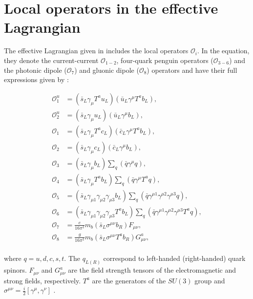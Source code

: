 \chapter{Local operators in the effective Lagrangian}\label{sec:appendix_local_opperators}

The effective Lagrangian given in  includes the local operators $\mathcal{O}_i$.
In the equation, they denote the current-current $\mathcal{O}_{1-2}$, four-quark penguin operators ($\mathcal{O}_{3-6}$) and the photonic dipole ($\mathcal{O}_{7}$) and gluonic dipole ($\mathcal{O}_{8}$) operators \cite{Misiak:2015xwa} and have their full expressions given by \cite{Kaminski:2012eb,Chetyrkin:1996vx}:

\begin{align*}
    \mathcal{O}_1^u & = (\bar{s}_L\gamma_\mu T^a u_L)(\bar{u}_L\gamma^\mu T^a b_L), \\
    \mathcal{O}_2^u & = (\bar{s}_L\gamma_\mu u_L)(\bar{u}_L\gamma^\mu b_L),\\ 
    \mathcal{O}_1 &   = (\bar{s}_L\gamma_\mu T^a c_L)(\bar{c}_L\gamma^\mu T^a b_L),\\ 
    \mathcal{O}_2 &   = (\bar{s}_L\gamma_\mu c_L)(\bar{c}_L\gamma^\mu b_L),\\ 
    \mathcal{O}_3 &   = (\bar{s}_L\gamma_\mu b_L)\sum_q(\bar{q}\gamma^{\mu}q),\\ 
    \mathcal{O}_4 &   = (\bar{s}_L\gamma_\mu T^a b_L)\sum_q(\bar{q}\gamma^{\mu}T^a q),\\ 
    \mathcal{O}_5 &   = (\bar{s}_L\gamma_{\mu 1}\gamma_{\mu 2}\gamma_{\mu 3}  b_L)\sum_q(\bar{q}\gamma^{\mu 1}\gamma^{\mu 2}\gamma^{\mu 3} q),\\
    \mathcal{O}_6 &   = (\bar{s}_L\gamma_{\mu 1}\gamma_{\mu 2}\gamma_{\mu 3} T^a b_L)\sum_q(\bar{q}\gamma^{\mu 1}\gamma^{\mu 2}\gamma^{\mu 3}T^a q),\\
    \mathcal{O}_7 &   =  \frac{e}{16\pi^2}m_b(\bar{s}_L\sigma^{\mu\nu}b_R)F_{\mu\nu},\\ 
    \mathcal{O}_8 &   =  \frac{g}{16\pi^2}m_b(\bar{s}_L\sigma^{\mu\nu}T^a b_R)G^a_{\mu\nu},\\ 
\end{align*}

where $q=u,d,c,s,t$. The $q_{L(R)}$ correspond to left-handed (right-handed) quark spinors.
$F_{\mu\nu}$ and $G^a_{\mu\nu}$ are the field strength tensors of the electromagnetic and strong fields, respectively.
$T^a$ are the generators of the $SU(3)$ group and $\sigma^{\mu\nu}=\frac{i}{2}[\gamma^{\mu},\gamma^{\nu}]$ \cite{Peskin:1995ev}.
